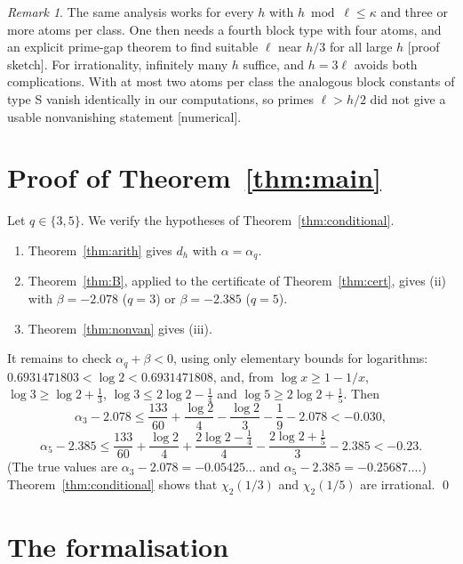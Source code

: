 \documentclass[11pt]{amsart}
\theoremstyle{definition}
\theoremstyle{remark}
\newtheorem{remark}[theorem]{Remark}
\numberwithin{equation}{section}
\begin{document}
\begin{remark}
The same analysis works for every $h$ with $h\bmod\ell\le\kappa$ and three or more atoms per class. One then needs a
fourth block type with four atoms, and an explicit prime-gap theorem to find suitable $\ell$ near $h/3$ for all large
$h$ [proof sketch]. For irrationality, infinitely many $h$ suffice, and $h=3\ell$ avoids both complications. With at
most two atoms per class the analogous block constants of type S vanish identically in our computations, so primes
$\ell>h/2$ did not give a usable nonvanishing statement [numerical].
\end{remark}

\section{Proof of Theorem~\ref{thm:main}}\label{sec:proof}

Let $q\in\{3,5\}$. We verify the hypotheses of Theorem~\ref{thm:conditional}.
\begin{enumerate}
\item Theorem~\ref{thm:arith} gives $d_h$ with $\alpha=\alpha_q$.
\item Theorem~\ref{thm:B}, applied to the certificate of Theorem~\ref{thm:cert}, gives (ii) with $\beta=-2.078$
  ($q=3$) or $\beta=-2.385$ ($q=5$).
\item Theorem~\ref{thm:nonvan} gives (iii).
\end{enumerate}
It remains to check $\alpha_q+\beta<0$, using only elementary bounds for logarithms: $0.6931471803<\log2<0.6931471808$,
and, from $\log x\ge1-1/x$, $\log3\ge\log2+\frac13$, $\log3\le2\log2-\frac14$ and $\log5\ge2\log2+\frac15$. Then
\[
  \alpha_3-2.078\le\frac{133}{60}+\frac{\log2}4-\frac{\log2}3-\frac19-2.078<-0.030,
\]
\[
  \alpha_5-2.385\le\frac{133}{60}+\frac{\log2}4+\frac{2\log2-\frac14}4-\frac{2\log2+\frac15}3-2.385<-0.23 .
\]
(The true values are $\alpha_3-2.078=-0.05425\ldots$ and $\alpha_5-2.385=-0.25687\ldots$.) Theorem~\ref{thm:conditional}
shows that $\chi_2(1/3)$ and $\chi_2(1/5)$ are irrational. \qed

\section{The formalisation}\label{sec:lean}
\end{document}
